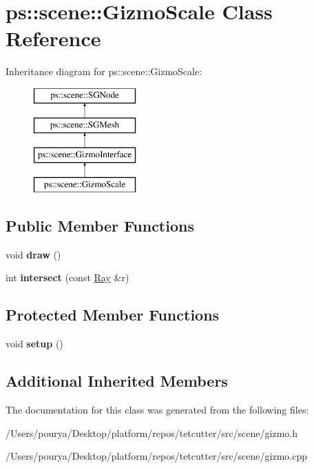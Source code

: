 \hypertarget{classps_1_1scene_1_1GizmoScale}{}\section{ps\+:\+:scene\+:\+:Gizmo\+Scale Class Reference}
\label{classps_1_1scene_1_1GizmoScale}
Inheritance diagram for ps\+:\+:scene\+:\+:Gizmo\+Scale\+:\begin{figure}[H]
\begin{center}
\leavevmode
\includegraphics[height=4.000000cm]{classps_1_1scene_1_1GizmoScale}
\end{center}
\end{figure}
\subsection*{Public Member Functions}
\begin{DoxyCompactItemize}
\item 
\hypertarget{classps_1_1scene_1_1GizmoScale_a2c5a8f89a0f2a054147e5798ee4446f8}{}void {\bfseries draw} ()\label{classps_1_1scene_1_1GizmoScale_a2c5a8f89a0f2a054147e5798ee4446f8}

\item 
\hypertarget{classps_1_1scene_1_1GizmoScale_af2c3f0a6992d8498340bef073ea227af}{}int {\bfseries intersect} (const \hyperlink{classps_1_1base_1_1Ray}{Ray} \&r)\label{classps_1_1scene_1_1GizmoScale_af2c3f0a6992d8498340bef073ea227af}

\end{DoxyCompactItemize}
\subsection*{Protected Member Functions}
\begin{DoxyCompactItemize}
\item 
\hypertarget{classps_1_1scene_1_1GizmoScale_a9fefd122b2bb835deec8f125ebea1f14}{}void {\bfseries setup} ()\label{classps_1_1scene_1_1GizmoScale_a9fefd122b2bb835deec8f125ebea1f14}

\end{DoxyCompactItemize}
\subsection*{Additional Inherited Members}


The documentation for this class was generated from the following files\+:\begin{DoxyCompactItemize}
\item 
/\+Users/pourya/\+Desktop/platform/repos/tetcutter/src/scene/gizmo.\+h\item 
/\+Users/pourya/\+Desktop/platform/repos/tetcutter/src/scene/gizmo.\+cpp\end{DoxyCompactItemize}
